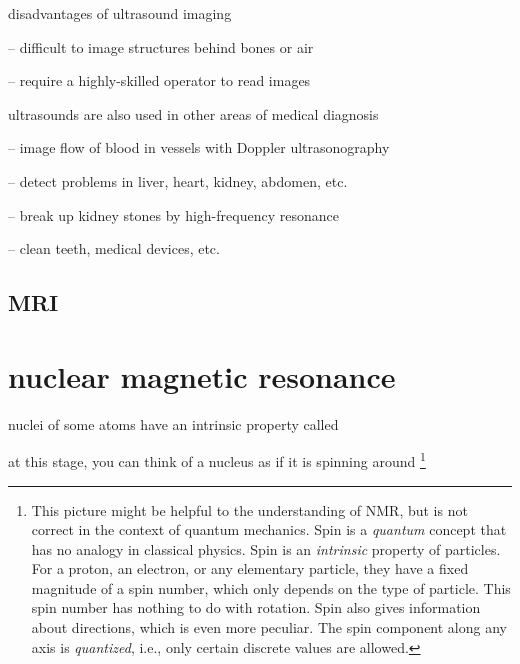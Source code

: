 \cmt disadvantages of ultrasound imaging

\begin{compactitem}
	\item[--] difficult to image structures behind bones or air
	
	\item[--] require a highly-skilled operator to read images
\end{compactitem}
	
\cmt ultrasounds are also used in other areas of medical diagnosis
	
\begin{compactitem}
	\item[--] image flow of blood in vessels with Doppler ultrasonography
	
	\item[--] detect problems in liver, heart, kidney, abdomen, etc.
	
	\item[--] break up kidney stones by high-frequency resonance
	
	\item[--] clean teeth, medical devices, etc.
\end{compactitem}




\subsection{MRI}

\section{nuclear magnetic resonance}

nuclei of some atoms have an intrinsic property called 

at this stage, you can think of a nucleus as if it is spinning around
\footnote{This picture might be helpful to the understanding of NMR, but is not correct in the context of quantum mechanics. Spin is a \emph{quantum} concept that has no analogy in classical physics. Spin is an \emph{intrinsic} property of particles. For a proton, an electron, or any elementary particle, they have a fixed magnitude of a spin number, which only depends on the type of particle. This spin number has nothing to do with rotation. Spin also gives information about directions, which is even more peculiar. The spin component along any axis is \emph{quantized}, i.e., only certain discrete values are allowed.}

